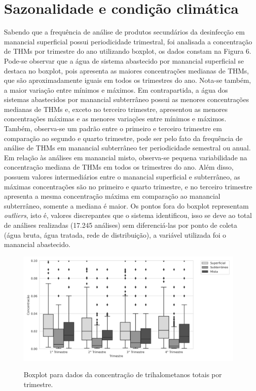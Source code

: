 \section{Sazonalidade e condição climática}

Sabendo que a frequência de análise de produtos secundários da desinfecção em manancial superficial possui periodicidade trimestral, foi analisada a concentração de THMs por trimestre do ano utilizando boxplot, os dados constam na Figura 6. Pode-se observar que a água de sistema abastecido por manancial superficial se destaca no boxplot, pois apresenta as maiores concentrações medianas de THMs, que são aproximadamente iguais em todos os trimestres do ano. Nota-se também, a maior variação entre mínimos e máximos. Em contrapartida, a água dos sistemas abastecidos por manancial subterrâneo possui as menores concentrações medianas de THMs e, exceto no terceiro trimestre, apresentou as menores concentrações máximas e as menores variações entre mínimos e máximos. Também, observa-se um padrão entre o primeiro e terceiro trimestre em comparação ao segundo e quarto trimestre, pode ser pelo fato da frequência de análise de THMs em manancial subterrâneo ter periodicidade semestral ou anual. Em relação às análises em manancial misto, observa-se pequena variabilidade na concentração mediana de THMs em todos os trimestres do ano. Além disso, possuem valores intermediários entre o manancial superficial e subterrâneo, as máximas concentrações são no primeiro e quarto trimestre, e no terceiro trimestre apresenta a mesma concentração máxima em comparação ao manancial subterrâneo, somente a mediana é maior. Os pontos fora do boxplot representam \textit{outliers}, isto é, valores discrepantes que o sistema identificou, isso se deve ao  total de análises realizadas (17.245 análises) sem diferenciá-las por ponto de coleta (água bruta, água tratada, rede de distribuição), a variável utilizada foi o manancial abastecido.




\begin{figure}[!htb]
\caption{\small Boxplot para dados da concentração de trihalometanos totais por trimestre.}
\centering
\includegraphics[scale=0.65]{images/boxplotmanancialportrimestre.png}
\label{fig02}
\end{figure}


